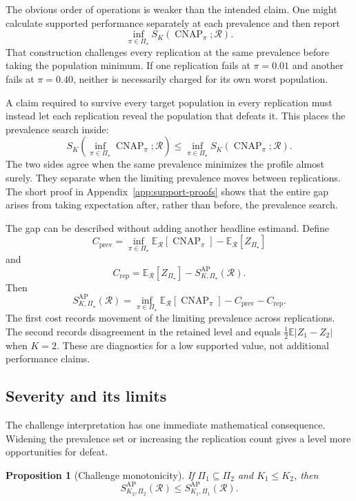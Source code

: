 \documentclass[11pt]{article}
\newcommand{\CNAP}{\operatorname{CNAP}}
\newcommand{\Regime}{\mathcal{R}}
\newcommand{\PSet}{\Pi_\star}
\newcommand{\E}{\mathbb{E}}
\newcommand{\SRob}{S_{K,\PSet}^{\mathrm{AP}}(\Regime)}
\newtheorem{proposition}{Proposition}
\theoremstyle{remark}
\begin{document}
The obvious order of operations is weaker than the intended claim. One might calculate supported performance separately at each prevalence and then report
\[
\inf_{\pi\in\PSet}
S_K(\CNAP_\pi;\Regime).
\]
That construction challenges every replication at the same prevalence before taking the population minimum. If one replication fails at $\pi=0.01$ and another fails at $\pi=0.40$, neither is necessarily charged for its own worst population.

A claim required to survive every target population in every replication must instead let each replication reveal the population that defeats it. This places the prevalence search inside:
\begin{equation}
S_K\left(
\inf_{\pi\in\PSet}\CNAP_\pi;\Regime
\right)
\leq
\inf_{\pi\in\PSet}
S_K(\CNAP_\pi;\Regime).
\label{eq:order}
\end{equation}
The two sides agree when the same prevalence minimizes the profile almost surely. They separate when the limiting prevalence moves between replications. The short proof in Appendix~\ref{app:support-proofs} shows that the entire gap arises from taking expectation after, rather than before, the prevalence search.

The gap can be described without adding another headline estimand. Define
\[
C_{\mathrm{prev}}
=
\inf_{\pi\in\PSet}\E_{\Regime}[\CNAP_\pi]
-
\E_{\Regime}[Z_{\PSet}]
\]
and
\[
C_{\mathrm{rep}}
=
\E_{\Regime}[Z_{\PSet}]
-\SRob.
\]
Then
\begin{equation}
\SRob
=
\inf_{\pi\in\PSet}\E_{\Regime}[\CNAP_\pi]
-C_{\mathrm{prev}}-C_{\mathrm{rep}}.
\label{eq:costs}
\end{equation}
The first cost records movement of the limiting prevalence across replications. The second records disagreement in the retained level and equals $\tfrac12\E|Z_1-Z_2|$ when $K=2$. These are diagnostics for a low supported value, not additional performance claims.

\subsection{Severity and its limits}

The challenge interpretation has one immediate mathematical consequence. Widening the prevalence set or increasing the replication count gives a level more opportunities for defeat.

\begin{proposition}[Challenge monotonicity]
\label{prop:monotonicity}
If $\Pi_1\subseteq\Pi_2$ and $K_1\leq K_2$, then
\[
S_{K_2,\Pi_2}^{\mathrm{AP}}(\Regime)
\leq
S_{K_1,\Pi_1}^{\mathrm{AP}}(\Regime).
\]
\end{proposition}
\end{document}
